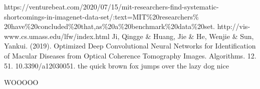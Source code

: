 \documentclass[conference]{IEEEtran}
\begin{document}
\begin{thebibliography}{00}
 https://venturebeat.com/2020/07/15/mit-researchers-find-systematic-shortcomings-in-imagenet-data-set/:text=MIT\%20researchers\% 20have\%20concluded\%20that,as\%20a\%20benchmark\%20data\%20set.
 http://vis-www.cs.umass.edu/lfw/index.html
 Ji, Qingge \& Huang, Jie \& He, Wenjie \& Sun, Yankui. (2019). Optimized Deep Convolutional Neural Networks for Identification of Macular Diseases from Optical Coherence Tomography Images. Algorithms. 12. 51. 10.3390/a12030051. 
 the quick brown fox
 jumps over
 the lazy dog
 nice
\end{thebibliography}
\vspace{12pt}
\color{red}
WOOOOO
\end{document}
